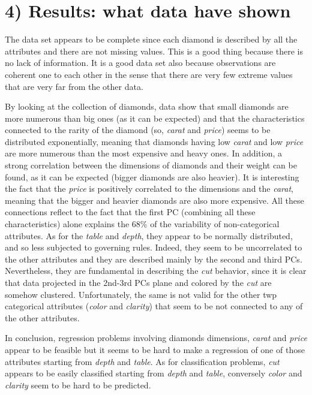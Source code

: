 \documentclass[
]{article}
\begin{document}
\section{4) Results: what data have
shown}\label{results-what-data-have-shown}

The data set appears to be complete since each diamond is described by
all the attributes and there are not missing values. This is a good
thing because there is no lack of information. It is a good data set
also because observations are coherent one to each other in the sense
that there are very few extreme values that are very far from the other
data.

By looking at the collection of diamonds, data show that small diamonds
are more numerous than big ones (as it can be expected) and that the
characteristics connected to the rarity of the diamond (so, \emph{carat}
and \emph{price}) seems to be distributed exponentially, meaning that
diamonds having low \emph{carat} and low \emph{price} are more numerous
than the most expensive and heavy ones. In addition, a strong
correlation between the dimensions of diamonds and their weight can be
found, as it can be expected (bigger diamonds are also heavier). It is
interesting the fact that the \emph{price} is positively correlated to
the dimensions and the \emph{carat}, meaning that the bigger and heavier
diamonds are also more expensive. All these connections reflect to the
fact that the first PC (combining all these characteristics) alone
explains the 68\% of the variability of non-categorical attributes. As
for the \emph{table} and \emph{depth}, they appear to be normally
distributed, and so less subjected to governing rules. Indeed, they seem
to be uncorrelated to the other attributes and they are described mainly
by the second and third PCs. Nevertheless, they are fundamental in
describing the \emph{cut} behavior, since it is clear that data
projected in the 2nd-3rd PCs plane and colored by the \emph{cut} are
somehow clustered. Unfortunately, the same is not valid for the other
twp categorical attributes (\emph{color} and \emph{clarity}) that seem
to be not connected to any of the other attributes.

In conclusion, regression problems involving diamonds dimensions,
\emph{carat} and \emph{price} appear to be feasible but it seems to be
hard to make a regression of one of those attributes starting from
\emph{depth} and \emph{table}. As for classification problems,
\emph{cut} appears to be easily classified starting from \emph{depth}
and \emph{table}, conversely \emph{color} and \emph{clarity} seem to be
hard to be predicted.
\end{document}
